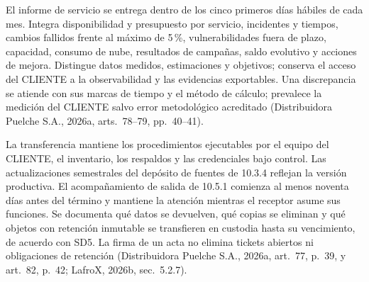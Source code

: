 El informe de servicio se entrega dentro de los cinco primeros días hábiles de cada mes. Integra disponibilidad y presupuesto por servicio, incidentes y tiempos, cambios fallidos frente al máximo de 5\,\%, vulnerabilidades fuera de plazo, capacidad, consumo de nube, resultados de campañas, saldo evolutivo y acciones de mejora. Distingue datos medidos, estimaciones y objetivos; conserva el acceso del CLIENTE a la observabilidad y las evidencias exportables. Una discrepancia se atiende con sus marcas de tiempo y el método de cálculo; prevalece la medición del CLIENTE salvo error metodológico acreditado (Distribuidora Puelche S.A., 2026a, arts.~78--79, pp.~40--41).

La transferencia mantiene los procedimientos ejecutables por el equipo del CLIENTE, el inventario, los respaldos y las credenciales bajo control. Las actualizaciones semestrales del depósito de fuentes de 10.3.4 reflejan la versión productiva. El acompañamiento de salida de 10.5.1 comienza al menos noventa días antes del término y mantiene la atención mientras el receptor asume sus funciones. Se documenta qué datos se devuelven, qué copias se eliminan y qué objetos con retención inmutable se transfieren en custodia hasta su vencimiento, de acuerdo con SD5. La firma de un acta no elimina tickets abiertos ni obligaciones de retención (Distribuidora Puelche S.A., 2026a, art.~77, p.~39, y art.~82, p.~42; LafroX, 2026b, sec.~5.2.7).
